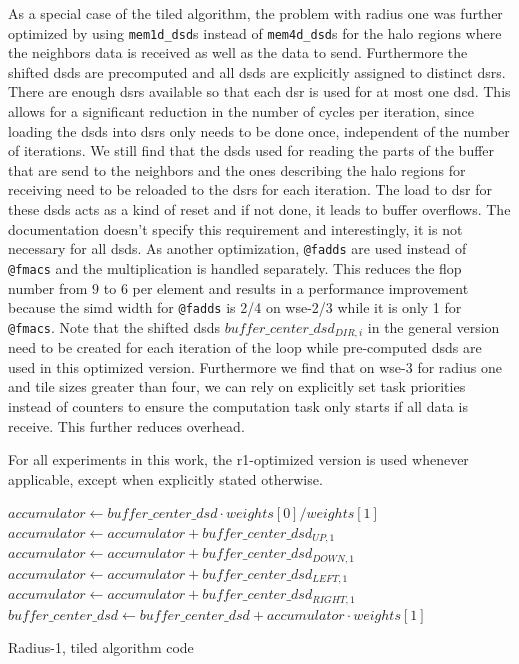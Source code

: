 As a special case of the tiled algorithm, the problem with radius one was further optimized by using \texttt{mem1d\_dsd}s instead of \texttt{mem4d\_dsd}s for the halo regions where the neighbors data is received as well as the data to send. Furthermore the shifted \acp{dsd} are precomputed and all \acp{dsd} are explicitly assigned to distinct \acp{dsr}. There are enough \acp{dsr} available so that each \ac{dsr} is used for at most one \ac{dsd}. This allows for a significant reduction in the number of cycles per iteration, since loading the \acp{dsd} into \acp{dsr} only needs to be done once, independent of the number of iterations. We still find that the \acp{dsd} used for reading the parts of the buffer that are send to the neighbors and the ones describing the halo regions for receiving need to be reloaded to the \acp{dsr} for each iteration. The load to \ac{dsr} for these \acp{dsd} acts as a kind of reset and if not done, it leads to buffer overflows. The documentation doesn't specify this requirement and interestingly, it is not necessary for all \acp{dsd}. 
As another optimization, \texttt{@fadds} are used instead of \texttt{@fmacs} and the multiplication is handled separately. This reduces the flop number from $9$ to $6$ per element and results in a performance improvement because the simd width for \texttt{@fadds} is 2/4 on wse-2/3 while it is only 1 for \texttt{@fmacs}. Note that the shifted \acp{dsd} $buffer\_center\_dsd_{DIR,i}$ in the general version need to be created for each iteration of the loop while pre-computed \acp{dsd} are used in this optimized version.
Furthermore we find that on \ac{wse}-3 for radius one and tile sizes greater than four, we can rely on explicitly set task priorities instead of counters to ensure the computation task only starts if all data is receive. This further reduces overhead. 

For all experiments in this work, the r1-optimized version is used whenever applicable, except when explicitly stated otherwise.

\begin{algorithm}[tbh]
    \SetAlgoLined
    $accumulator \gets buffer\_center\_dsd \cdot weights[0]/weights[1]$\;
    $accumulator \gets accumulator + buffer\_center\_dsd_{UP,1}$\;
    $accumulator \gets accumulator + buffer\_center\_dsd_{DOWN,1}$\;
    $accumulator \gets accumulator + buffer\_center\_dsd_{LEFT,1}$\;
    $accumulator \gets accumulator + buffer\_center\_dsd_{RIGHT,1}$\;
    $buffer\_center\_dsd \gets buffer\_center\_dsd + accumulator \cdot weights[1]$\;
    \caption{Radius-1, tiled algorithm code}\label{alg:r1_tiled_algorithm}
\end{algorithm}

